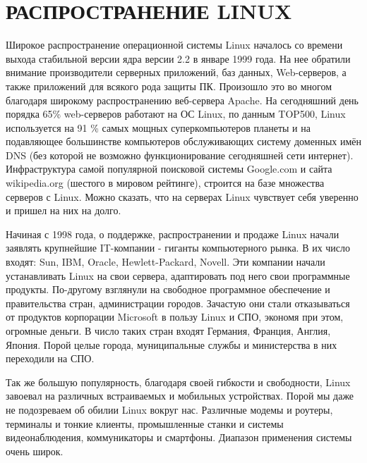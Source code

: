\section{РАСПРОСТРАНЕНИЕ LINUX}
\par Широкое распространение операционной системы Linux началось со времени выхода стабильной версии ядра версии 2.2 в январе 1999 года. На нее обратили внимание производители серверных приложений, баз данных, Web-серверов, а также приложений для всякого рода защиты ПК. Произошло это во многом благодаря широкому распространению веб-сервера Apache. На сегодняшний день порядка 65\% web-серверов работают на ОС Linux, по данным TOP500, Linux используется на 91 \% самых мощных суперкомпьютеров планеты и на подавляющее большинстве компьютеров обслуживающих систему доменных имён DNS (без которой не возможно функционирование сегодняшней сети интернет). Инфраструктура самой популярной поисковой системы Google.com и сайта wikipedia.org (шестого в мировом рейтинге), строится на базе множества серверов с Linux. Можно сказать, что на серверах Linux чувствует себя уверенно и пришел на них на долго.
\par Начиная с 1998 года, о поддержке, распространении и продаже Linux начали заявлять крупнейшие IT-компании - гиганты компьютерного рынка. В их число входят: Sun, IBM, Oracle, Hewlett-Packard, Novell. Эти компании начали устанавливать Linux на свои сервера, адаптировать под него свои программные продукты. По-другому взглянули на свободное программное обеспечение и правительства стран, администрации городов. Зачастую они стали отказываться от продуктов корпорации Microsoft в пользу Linux и СПО, экономя при этом, огромные деньги. В число таких стран входят Германия, Франция, Англия, Япония. Порой целые города, муниципальные службы и министерства в них переходили на СПО.
\par Так же большую популярность, благодаря своей гибкости и свободности, Linux завоевал на различных встраиваемых и мобильных устройствах. Порой мы даже не подозреваем об обилии Linux вокруг нас. Различные модемы и роутеры, терминалы и тонкие клиенты, промышленные станки и системы видеонаблюдения, коммуникаторы и смартфоны. Диапазон применения системы очень широк.
